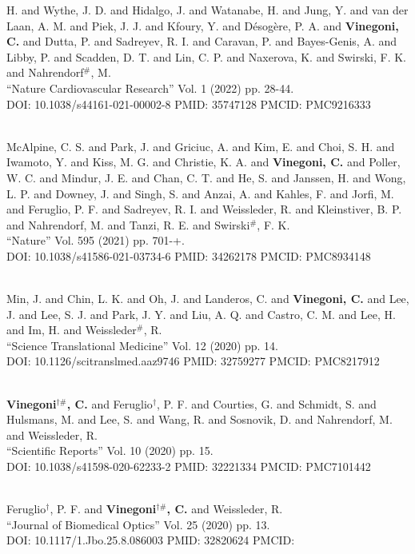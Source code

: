 H. and Wythe, J. D. and Hidalgo, J. and Watanabe, H. and Jung, Y. and van der Laan, A. M. and Piek, J. J. and Kfoury, Y. and Désogère, P. A. and {\bf Vinegoni, C.} and Dutta, P. and Sadreyev, R. I. and Caravan, P. and Bayes-Genis, A. and Libby, P. and Scadden, D. T. and Lin, C. P. and Naxerova, K. and Swirski, F. K. and Nahrendorf$^\#$, M. \\ ``Nature Cardiovascular Research'' Vol. 1 (2022) pp. 28-44. \\ DOI: 10.1038/s44161-021-00002-8 PMID: 35747128 PMCID: PMC9216333\item {} \\ McAlpine, C. S. and Park, J. and Griciuc, A. and Kim, E. and Choi, S. H. and Iwamoto, Y. and Kiss, M. G. and Christie, K. A. and {\bf Vinegoni, C.} and Poller, W. C. and Mindur, J. E. and Chan, C. T. and He, S. and Janssen, H. and Wong, L. P. and Downey, J. and Singh, S. and Anzai, A. and Kahles, F. and Jorfi, M. and Feruglio, P. F. and Sadreyev, R. I. and Weissleder, R. and Kleinstiver, B. P. and Nahrendorf, M. and Tanzi, R. E. and Swirski$^\#$, F. K. \\ ``Nature'' Vol. 595 (2021) pp. 701-+. \\ DOI: 10.1038/s41586-021-03734-6 PMID: 34262178 PMCID: PMC8934148\item {} \\ Min, J. and Chin, L. K. and Oh, J. and Landeros, C. and {\bf Vinegoni, C.} and Lee, J. and Lee, S. J. and Park, J. Y. and Liu, A. Q. and Castro, C. M. and Lee, H. and Im, H. and Weissleder$^\#$, R. \\ ``Science Translational Medicine'' Vol. 12 (2020) pp. 14. \\ DOI: 10.1126/scitranslmed.aaz9746 PMID: 32759277 PMCID: PMC8217912\item {} \\ {\bf Vinegoni$^{\dag \#}$, C.} and Feruglio$^\dag$, P. F. and Courties, G. and Schmidt, S. and Hulsmans, M. and Lee, S. and Wang, R. and Sosnovik, D. and Nahrendorf, M. and Weissleder, R. \\ ``Scientific Reports'' Vol. 10 (2020) pp. 15. \\ DOI: 10.1038/s41598-020-62233-2 PMID: 32221334 PMCID: PMC7101442\item {} \\ Feruglio$^\dag$, P. F. and {\bf Vinegoni$^{\dag \#}$, C.} and Weissleder, R. \\ ``Journal of Biomedical Optics'' Vol. 25 (2020) pp. 13. \\ DOI: 10.1117/1.Jbo.25.8.086003 PMID: 32820624 PMCID: 